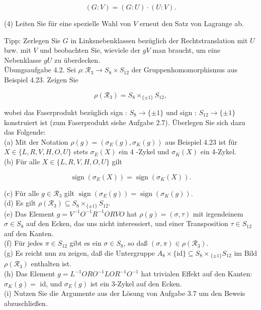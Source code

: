 \documentclass[10pt, letterpaper]{article}
\begin{document}
$$
(G: V)=(G: U) \cdot(U: V) .
$$

(4) Leiten Sie für eine spezielle Wahl von $V$ erneut den Satz von Lagrange ab.

Tipp: Zerlegen Sie $G$ in Linksnebenklassen bezüglich der Rechtstranslation mit $U$ bzw. mit $V$ und beobachten Sie, wieviele der $g V$ man braucht, um eine Nebenklasse $g U$ zu überdecken.\\
Übungsaufgabe 4.2. Sei $\rho: \mathscr{R}_{3} \rightarrow S_{8} \times S_{12}$ der Gruppenhomomorphismus aus Beispiel 4.23. Zeigen Sie

$$
\rho\left(\mathscr{R}_{3}\right)=S_{8} \times_{\{ \pm 1\}} S_{12},
$$

wobei das Faserprodukt bezüglich sign : $S_{8} \rightarrow\{ \pm 1\}$ und sign : $S_{12} \rightarrow\{ \pm 1\}$ konstruiert ist (zum Faserprodukt siehe Aufgabe 2.7). Überlegen Sie sich dazu das Folgende:\\
(a) Mit der Notation $\rho(g)=\left(\sigma_{E}(g), \sigma_{K}(g)\right)$ aus Beispiel 4.23 ist für $X \in\{L, R, V, H, O, U\}$ stets $\sigma_{E}(X)$ ein 4 -Zykel und $\sigma_{K}(X)$ ein 4-Zykel.\\
(b) Für alle $X \in\{L, R, V, H, O, U\}$ gilt

$$
\operatorname{sign}\left(\sigma_{E}(X)\right)=\operatorname{sign}\left(\sigma_{K}(X)\right) .
$$

(c) Für alle $g \in \mathscr{R}_{3}$ gilt $\operatorname{sign}\left(\sigma_{E}(g)\right)=\operatorname{sign}\left(\sigma_{K}(g)\right)$.\\
(d) Es gilt $\rho\left(\mathscr{R}_{3}\right) \subseteq S_{8} \times_{\{ \pm 1\}} S_{12}$.\\
(e) Das Element $g=V^{-1} O^{-1} R^{-1} O R V O$ hat $\rho(g)=(\sigma, \tau)$ mit irgendeinem $\sigma \in S_{8}$ auf den Ecken, das uns nicht interessiert, und einer Transposition $\tau \in S_{12}$ auf den Kanten.\\
(f) Für jedes $\pi \in S_{12}$ gibt es ein $\sigma \in S_{8}$, so daß $(\sigma, \pi) \in \rho\left(\mathscr{R}_{3}\right)$.\\
(g) Es reicht nun zu zeigen, daß die Untergruppe $A_{8} \times\{\mathrm{id}\} \subseteq S_{8} \times{ }_{\{ \pm 1\}} S_{12}$ im Bild $\rho\left(\mathscr{R}_{3}\right)$ enthalten ist.\\
(h) Das Element $g=L^{-1} O R O^{-1} L O R^{-1} O^{-1}$ hat trivialen Effekt auf den Kanten: $\sigma_{K}(g)=$ id, und $\sigma_{E}(g)$ ist ein 3-Zykel auf den Ecken.\\
(i) Nutzen Sie die Argumente aus der Lösung von Aufgabe 3.7 um den Beweis abzuschließen.
\end{document}
